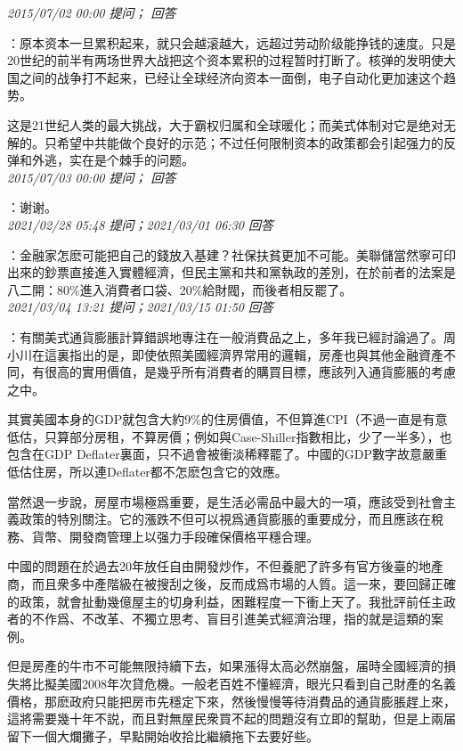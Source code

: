 \documentclass[twocolumn]{ctexart}
\begin{document}
\textit{\hfill\noindent\small 2015/07/02 00:00 提问； 回答}

：原本资本一旦累积起来，就只会越滚越大，远超过劳动阶级能挣钱的速度。只是20世纪的前半有两场世界大战把这个资本累积的过程暂时打断了。核弹的发明使大国之间的战争打不起来，已经让全球经济向资本一面倒，电子自动化更加速这个趋势。

这是21世纪人类的最大挑战，大于霸权归属和全球暖化；而美式体制对它是绝对无解的。只希望中共能做个良好的示范；不过任何限制资本的政策都会引起强力的反弹和外逃，实在是个棘手的问题。\\

\textit{\hfill\noindent\small 2015/07/03 00:00 提问； 回答}

：谢谢。\\

\textit{\hfill\noindent\small 2021/02/28 05:48 提问；2021/03/01 06:30 回答}

：金融家怎麽可能把自己的錢放入基建？社保扶貧更加不可能。美聯儲當然寧可印出來的鈔票直接進入實體經濟，但民主黨和共和黨執政的差別，在於前者的法案是八二開：80\%進入消費者口袋、20\%給財閥，而後者相反罷了。
\\

\textit{\hfill\noindent\small 2021/03/04 13:21 提问；2021/03/15 01:50 回答}

：有關美式通貨膨脹計算錯誤地專注在一般消費品之上，多年我已經討論過了。周小川在這裏指出的是，即使依照美國經濟界常用的邏輯，房產也與其他金融資產不同，有很高的實用價值，是幾乎所有消費者的購買目標，應該列入通貨膨脹的考慮之中。

其實美國本身的GDP就包含大約9\%的住房價值，不但算進CPI（不過一直是有意低估，只算部分房租，不算房價；例如與Case-Shiller指數相比，少了一半多），也包含在GDP Deflater裏面，只不過會被衝淡稀釋罷了。中國的GDP數字故意嚴重低估住房，所以連Deflater都不怎麽包含它的效應。

當然退一步說，房屋市場極爲重要，是生活必需品中最大的一項，應該受到社會主義政策的特別關注。它的漲跌不但可以視爲通貨膨脹的重要成分，而且應該在稅務、貨幣、開發商管理上以强力手段確保價格平穩合理。

中國的問題在於過去20年放任自由開發炒作，不但養肥了許多有官方後臺的地產商，而且衆多中產階級在被搜刮之後，反而成爲市場的人質。這一來，要回歸正確的政策，就會扯動幾億屋主的切身利益，困難程度一下衝上天了。我批評前任主政者的不作爲、不改革、不獨立思考、盲目引進美式經濟治理，指的就是這類的案例。

但是房產的牛市不可能無限持續下去，如果漲得太高必然崩盤，届時全國經濟的損失將比擬美國2008年次貸危機。一般老百姓不懂經濟，眼光只看到自己財產的名義價格，那麽政府只能把房市先穩定下來，然後慢慢等待消費品的通貨膨脹趕上來，這將需要幾十年不説，而且對無屋民衆買不起的問題沒有立即的幫助，但是上兩届留下一個大爛攤子，早點開始收拾比繼續拖下去要好些。
\\
\end{document}
